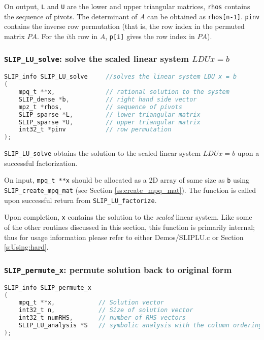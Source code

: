 \documentclass[11pt]{article}
\theoremstyle{definition}
\begin{document}
On output, \verb|L| and \verb|U| are the lower and upper triangular matrices, \verb|rhos| contains the sequence of pivots. The determinant of $A$ can be obtained as \verb|rhos[n-1]|. \verb|pinv| contains the inverse row permutation (that is, the row index in the permuted matrix $PA$. For the $i$th row in $A$, \verb|p[i]| gives the row index in $PA$).


\cprotect\subsubsection{\verb|SLIP_LU_solve|: solve the scaled linear system $LDUx=b$}\label{ss:SLIP_LU_solve}


\begin{lstlisting}[language=C,frame=single]
SLIP_info SLIP_LU_solve     //solves the linear system LDU x = b
(
    mpq_t **x,              // rational solution to the system
    SLIP_dense *b,          // right hand side vector
    mpz_t *rhos,            // sequence of pivots
    SLIP_sparse *L,         // lower triangular matrix
    SLIP_sparse *U,         // upper triangular matrix
    int32_t *pinv           // row permutation
);
\end{lstlisting}

\verb|SLIP_LU_solve| obtains the solution to the scaled linear system $LDUx=b$ upon a successful factorization.

On input, \verb|mpq_t **x| should be allocated as a 2D array of same size as \verb|b| using \verb|SLIP_create_mpq_mat| (see Section \ref{ss:create_mpq_mat}). The function is called upon successful return from \verb|SLIP_LU_factorize|.

Upon completion, \verb|x| contains the solution to the \textit{scaled} linear system. Like some of the other routines discussed in this section, this function is primarily internal; thus for usage information please refer to either Demos/SLIPLU.c or Section \ref{s:Using:hard}.

\cprotect\subsubsection{\verb|SLIP_permute_x|: permute solution back to original form}\label{ss:SLIP_permute_x}

\begin{lstlisting}[language=C,frame=single]
SLIP_info SLIP_permute_x
(
    mpq_t **x,            // Solution vector
    int32_t n,            // Size of solution vector
    int32_t numRHS,       // number of RHS vectors
    SLIP_LU_analysis *S   // symbolic analysis with the column ordering Q
);
\end{lstlisting}
\end{document}
